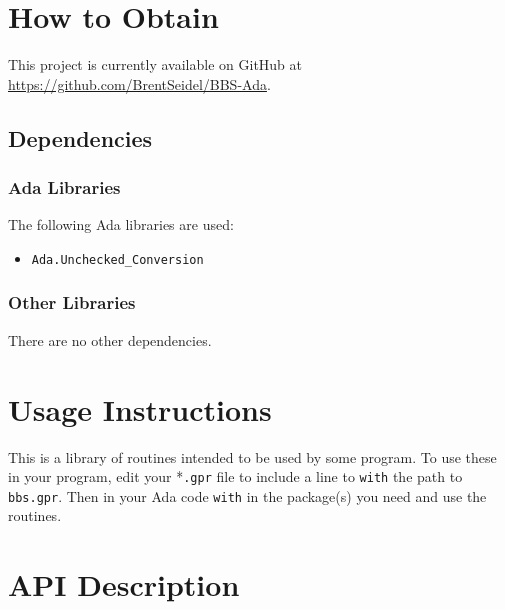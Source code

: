 \documentclass[10pt, openany]{book}
\newcommand{\package}[1]{\texttt{#1}}
\newcommand{\keyword}[1]{\texttt{#1}}
\begin{document}
\chapter{How to Obtain}

This project is currently available on GitHub at \url{https://github.com/BrentSeidel/BBS-Ada}.

\section{Dependencies}
\subsection{Ada Libraries}
The following Ada libraries are used:
\begin{itemize}
  \item \package{Ada.Unchecked\_Conversion}
\end{itemize}
\subsection{Other Libraries}
There are no other dependencies.

\chapter{Usage Instructions}
This is a library of routines intended to be used by some program.  To use these in your program, edit your *\keyword{.gpr} file to include a line to \keyword{with} the path to \keyword{bbs.gpr}.  Then in your Ada code \keyword{with} in the package(s) you need and use the routines.

\chapter{API Description}
\end{document}
